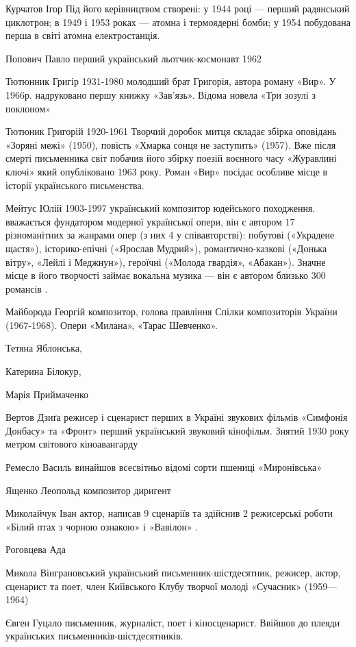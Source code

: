Курчатов Ігор Під його керівництвом створені: у 1944 році — перший радянський циклотрон; в 1949 і 1953 роках — атомна і термоядерні бомби; у 1954 побудована перша в світі атомна електростанція.

Попович Павло перший український льотчик-космонавт 1962

Тютюнник Григір 1931-1980 молодший брат Григорія, автора роману «Вир». У 1966р. надруковано першу книжку «Зав’язь». Відома новела «Три зозулі з поклоном»

Тютюник Григорій 1920-1961 Творчий доробок митця складає збірка оповідань «Зоряні межі» (1950), повість «Хмарка сонця не заступить» (1957). Вже після смерті письменника світ побачив його збірку поезій воєнного часу «Журавлині ключі» який опубліковано 1963 року. Роман «Вир» посідає особливе місце в історії українського письменства.

Мейтус Юлій 1903-1997 український композитор юдейського походження. вважається фундатором модерної української опери, він є автором 17 різноманітних за жанрами опер (з них 4 у співавторстві): побутові («Украдене щастя»), історико-епічні («Ярослав Мудрий»), романтично-казкові («Донька вітру», «Лейлі і Меджнун»), героїчні («Молода гвардія», «Абакан»). Значне місце в його творчості займає вокальна музика — він є автором близько 300 романсів .

Майборода Георгій  композитор, голова правління Спілки композиторів України (1967-1968).  Опери «Милана», «Тарас Шевченко».

Тетяна Яблонська,

Катерина Білокур,

Марія Приймаченко

Вертов Дзиґа режисер і сценарист перших в Україні звукових фільмів «Симфонія Донбасу» та «Фронт» перший український звуковий кінофільм. Знятий 1930 року метром світового кіноавангарду

Ремесло Василь винайшов всесвітньо відомі сорти пшениці «Миронівська»

Ященко Леопольд композитор диригент

Миколайчук Іван актор, написав 9 сценаріїв та здійснив 2 режисерські роботи «Білий птах з чорною ознакою» і «Вавілон» .

Роговцева Ада

Микола Вінграновський український письменник-шістдесятник, режисер, актор, сценарист та поет, член Киїівського Клубу творчої молоді «Сучасник» (1959—1964)

Євген Гуцало письменник, журналіст, поет і кіносценарист. Ввійшов до плеяди українських письменників-шістдесятників.

